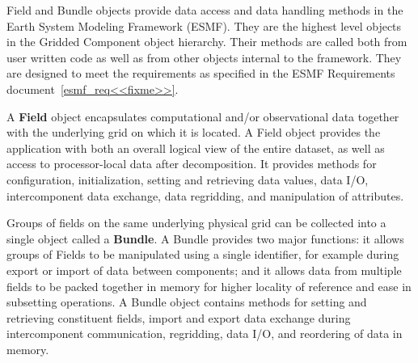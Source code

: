

Field and Bundle objects provide 
data access and data handling methods
in the Earth System Modeling Framework (ESMF).
They are the highest level objects in the
Gridded Component object hierarchy.
Their methods are called both from user written
code as well as from other objects internal to the framework.
They are designed to meet the requirements as specified in the 
ESMF Requirements document~\ref{esmf_req<<fixme>>}.

A {\bf Field} 
object encapsulates computational and/or observational data together 
with the underlying grid on which it is located.  
A Field object provides the
application with both an overall logical view of the entire
dataset, as well as access to processor-local data after decomposition.
It provides methods for configuration, initialization, setting and
retrieving data values, data I/O, intercomponent data 
exchange, data regridding, and manipulation of attributes.

Groups of fields on the same underlying physical grid 
can be collected into a single
object called a {\bf Bundle}.  
A Bundle provides two major functions: it allows groups of Fields
to be manipulated using a single identifier, for example during
export or import of data between components; and it allows
data from multiple fields to be packed together in memory 
for higher locality of reference and ease in subsetting operations.
A Bundle object contains methods
for setting and retrieving constituent fields, import and export
data exchange during intercomponent communication,
regridding, data I/O, and reordering of data in memory.



